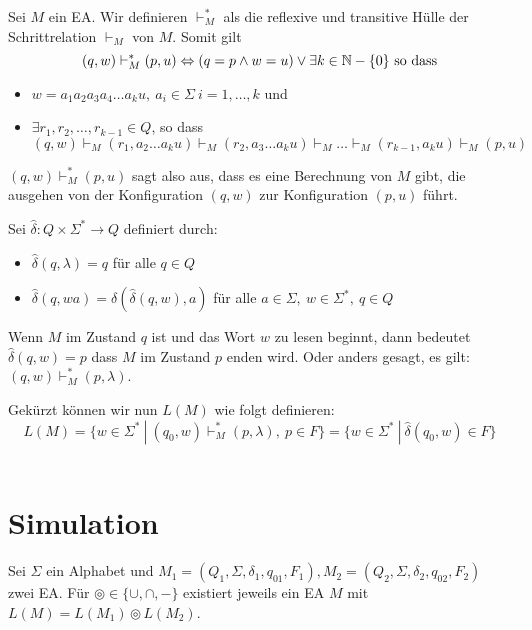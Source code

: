 \begin{definition}
Sei $M$ ein EA. Wir definieren $\vdash_M^*$ als die reflexive und transitive Hülle der Schrittrelation $\vdash_M$ von $M$. Somit gilt
\[
(q, w) \vdash_M^* (p, u) \Leftrightarrow (q = p \land w = u) \lor \exists k \in \mathbb{N} - \{0\} \text{ so dass}
\]
\begin{itemize}
  \item $w = a_1 a_2 a_3 a_4 \ldots a_k u, \ a_i \in \Sigma \ i = 1, \ldots, k$ und
  \item $\exists r_1, r_2, \ldots, r_{k-1} \in Q$, so dass
  $(q, w) \vdash_M (r_1, a_2\ldots a_k u) \vdash_M (r_2, a_3 \ldots a_k u) \vdash_M \ldots \vdash_M (r_{k-1}, a_k u) \vdash_M (p, u)$
\end{itemize}

$(q, w) \vdash_M^* (p, u)$ sagt also aus, dass es eine Berechnung von $M$ gibt, die ausgehen von der Konfiguration $(q, w)$ zur Konfiguration $(p, u)$ führt.\\
\end{definition}

\begin{definition}
Sei $\hat{\delta}: Q \times \Sigma^* \to Q$ definiert durch:
\begin{itemize}
  \item $\hat\delta(q, \lambda) = q$ für alle $q \in Q$
  \item $\hat\delta(q, wa) = \delta(\hat\delta(q, w), a)$ für alle $a \in \Sigma,\ w \in \Sigma^*,\ q \in Q$
\end{itemize}

Wenn $M$ im Zustand $q$ ist und das Wort $w$ zu lesen beginnt, dann bedeutet $\hat\delta(q, w) = p$ dass $M$ im Zustand $p$ enden wird. Oder anders gesagt, es gilt: $(q, w) \vdash_M^* (p, \lambda)$.

Gekürzt können wir nun $L(M)$ wie folgt definieren:
\[
L(M) = \{ w \in \Sigma^* \ |\ (q_0, w) \vdash_M^* (p, \lambda),\ p \in F \} = \{ w \in \Sigma^* \ |\ \hat\delta(q_0, w) \in F \}
\]\\
\end{definition}

\section{Simulation}
\begin{lemma}
Sei $\Sigma$ ein Alphabet und $M_1 = (Q_1, \Sigma, \delta_1, q_{01}, F_1), M_2 = (Q_2, \Sigma, \delta_2, q_{02}, F_2)$ zwei EA. Für $\circledcirc \in \{\cup, \cap, -\}$ existiert jeweils ein EA $M$ mit $L(M) = L(M_1) \circledcirc L(M_2)$.
\end{lemma}

